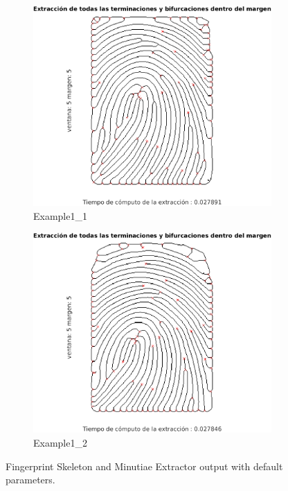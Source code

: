 \documentclass[11pt]{article}
\begin{document}
\begin{figure}[h!]
  \centering
       \begin{subfigure}[t]{0.45\textwidth}
         \centering
         \includegraphics[scale=0.5]{img/extraction_1}
         \caption{Example1\_1}
     \end{subfigure}%
     \quad
     \begin{subfigure}[t]{0.45\textwidth}
         \centering
         \includegraphics[scale=0.5]{img/extraction_2}
         \caption{Example1\_2}
     \end{subfigure}
    \caption{Fingerprint Skeleton and Minutiae Extractor output with default parameters.}
    \label{fig:ex5a}
\end{figure}
\end{document}
